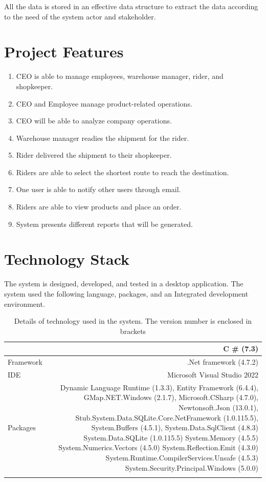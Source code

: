 \documentclass[12pt,a4paper]{article}
\begin{document}
All the data is stored in an effective data structure to extract the data according to the need of the system actor and stakeholder.
\section{Project Features}

\begin{enumerate}
\item CEO is able to manage employees, warehouse manager, rider, and shopkeeper.  
\item CEO and Employee manage product-related operations.
\item CEO will be able to analyze company operations.  
\item Warehouse manager readies the shipment for the rider. 
\item Rider delivered the shipment to their shopkeeper. 
\item Riders are able to select the shortest route to reach the destination.  
\item One user is able to notify other users through email.
\item Riders are able to view products and place an order. 
\item System presents different reports that will be generated.

\end{enumerate}


\newpage
\section{Technology Stack}
The system is designed, developed, and tested in a desktop application. The system used the following language, packages, and an Integrated development environment.\\
\begin{longtable}{lr} 
 \caption{Details of technology used in the system. The version number is enclosed in brackets }\\
\begin{tabular}{ | m{4cm} | m{12cm}| } 
  \hline
Language & C \#  (7.3)  \\
 \hline
 Framework & .Net framework (4.7.2) \\
 \hline
IDE  & Microsoft Visual Studio 2022
 \\ \hline
 Packages    & 
Dynamic Language Runtime (1.3.3),
Entity Framework (6.4.4),
GMap.NET.Windows (2.1.7),
Microsoft.CSharp (4.7.0),
Newtonsoft.Json (13.0.1),
Stub.System.Data.SQLite.Core.NetFramework (1.0.115.5),
System.Buffers (4.5.1),
System.Data.SqlClient (4.8.3)
System.Data.SQLite (1.0.115.5)
System.Memory (4.5.5)
System.Numerics.Vectors (4.5.0)
System.Reflection.Emit (4.3.0)
System.Runtime.CompilerServices.Unsafe (4.5.3)
System.Security.Principal.Windows (5.0.0)
 
 \\ \hline
\end{tabular}
\end{longtable}
\end{document}
